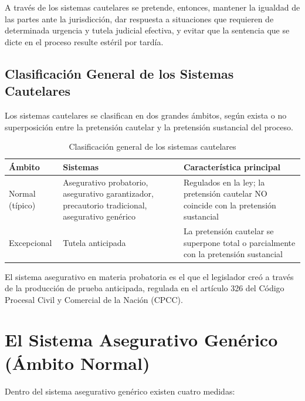 \documentclass[12pt,oneside]{book}
\begin{document}
A través de los sistemas cautelares se pretende, entonces, mantener la igualdad de las partes ante la jurisdicción, dar respuesta a situaciones que requieren de determinada urgencia y tutela judicial efectiva, y evitar que la sentencia que se dicte en el proceso resulte estéril por tardía.

\section{Clasificación General de los Sistemas Cautelares}

Los sistemas cautelares se clasifican en dos grandes ámbitos, según exista o no superposición entre la pretensión cautelar y la pretensión sustancial del proceso.

\begin{table}[H]
\centering
\caption{Clasificación general de los sistemas cautelares}
\begin{tabularx}{\textwidth}{>{\raggedright\arraybackslash}p{} >{\raggedright\arraybackslash}p{} >{\raggedright\arraybackslash}X}
\toprule
\textbf{Ámbito} & \textbf{Sistemas} & \textbf{Característica principal} \\
\midrule
Normal (típico) & Asegurativo probatorio, asegurativo garantizador, precautorio tradicional, asegurativo genérico & Regulados en la ley; la pretensión cautelar NO coincide con la pretensión sustancial \\
Excepcional & Tutela anticipada & La pretensión cautelar se superpone total o parcialmente con la pretensión sustancial \\
\bottomrule
\end{tabularx}
\end{table}

El sistema asegurativo en materia probatoria es el que el legislador creó a través de la producción de prueba anticipada, regulada en el artículo 326 del Código Procesal Civil y Comercial de la Nación (CPCC).

\chapter[Sistema Asegurativo Genérico]{El Sistema Asegurativo Genérico (Ámbito Normal)}

Dentro del sistema asegurativo genérico existen cuatro medidas:
\end{document}
